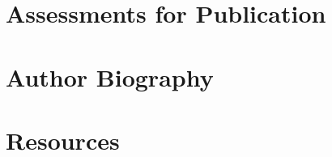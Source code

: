 \documentclass[openright]{book}
\begin{document}





\appendix

\chapter{Assessments for Publication}
  \clearpage  %

\chapter{Author Biography}



\chapter{Resources}
  

 \clearpage%

%

\end{document}
